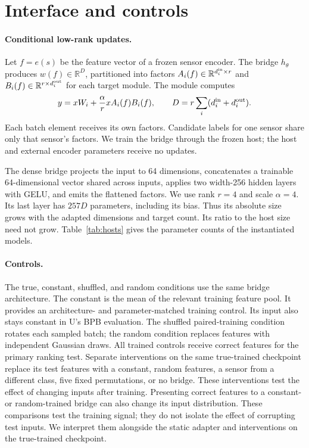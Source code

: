 \documentclass[11pt]{article}
\begin{document}
\section{Interface and controls}
\label{sec:method}
\paragraph{Conditional low-rank updates.}
Let $f=e(s)$ be the feature vector of a frozen sensor encoder. The bridge
$h_\theta$ produces $w(f)\in\mathbb{R}^{D}$, partitioned into factors
$A_i(f)\in\mathbb{R}^{d_i^{\rm in}\times r}$ and
$B_i(f)\in\mathbb{R}^{r\times d_i^{\rm out}}$ for each target module. The module computes
\[
 y=xW_i+\frac{\alpha}{r}xA_i(f)B_i(f),\qquad
 D=r\sum_i(d_i^{\rm in}+d_i^{\rm out}).
\]
Each batch element receives its own factors. Candidate labels for one sensor
share only that sensor's factors. We train the bridge through the frozen host;
the host and external encoder parameters receive no updates.

The dense bridge projects the input to 64 dimensions, concatenates a trainable
64-dimensional vector shared across inputs, applies two width-256 hidden layers
with GELU, and emits the flattened factors. We use rank $r=4$ and scale $\alpha=4$.
Its last layer has $257D$ parameters, including its bias. Thus its absolute size
grows with the adapted dimensions and target count. Its ratio to the host size need not grow.
Table~\ref{tab:hosts} gives the parameter counts of the instantiated models.

\paragraph{Controls.}
The true, constant, shuffled, and random conditions use the same bridge
architecture. The constant is the mean of the relevant training feature pool.
It provides an architecture- and parameter-matched training control. Its input
also stays constant in U's BPB evaluation. The shuffled paired-training condition rotates each sampled batch;
the random condition replaces features with independent Gaussian draws. All
trained controls receive correct features for the primary ranking test.
Separate interventions on the same true-trained checkpoint replace its test
features with a constant, random features, a sensor from a different class,
five fixed permutations, or no bridge. These interventions test the effect of
changing inputs after training.
Presenting correct features to a constant- or random-trained bridge can also
change its input distribution. These comparisons test the training signal;
they do not isolate the effect of corrupting test inputs. We interpret them
alongside the static adapter and interventions on the true-trained checkpoint.
\end{document}
